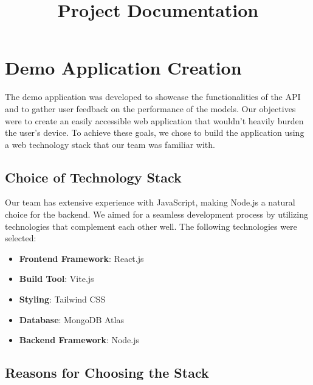 \documentclass{article}
\title{Project Documentation}
\date{}
\begin{document}
\maketitle

\section{Demo Application Creation}

The demo application was developed to showcase the functionalities of the API and to gather user feedback on the performance of the models. Our objectives were to create an easily accessible web application that wouldn't heavily burden the user's device. To achieve these goals, we chose to build the application using a web technology stack that our team was familiar with.

\subsection{Choice of Technology Stack}

Our team has extensive experience with JavaScript, making Node.js a natural choice for the backend. We aimed for a seamless development process by utilizing technologies that complement each other well. The following technologies were selected:

\begin{itemize}
    \item \textbf{Frontend Framework}: React.js
    \item \textbf{Build Tool}: Vite.js
    \item \textbf{Styling}: Tailwind CSS
    \item \textbf{Database}: MongoDB Atlas
    \item \textbf{Backend Framework}: Node.js
\end{itemize}

\subsection{Reasons for Choosing the Stack}
\end{document}
